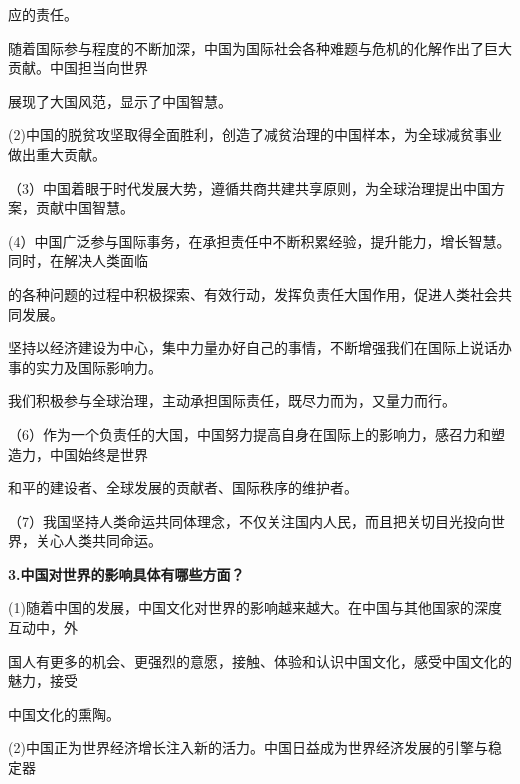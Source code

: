 \documentclass[lang=cn,11pt]{elegantbook}
\begin{document}
应的责任。\par

随着国际参与程度的不断加深，中国为国际社会各种难题与危机的化解作出了巨大贡献。中国担当向世界\par

展现了大国风范，显示了中国智慧。\par

(2)中国的脱贫攻坚取得全面胜利，创造了减贫治理的中国样本，为全球减贫事业做出重大贡献。\par

（3）中国着眼于时代发展大势，遵循共商共建共享原则，为全球治理提出中国方案，贡献中国智慧。\par

(4）中国广泛参与国际事务，在承担责任中不断积累经验，提升能力，增长智慧。同时，在解决人类面临\par

的各种问题的过程中积极探索、有效行动，发挥负责任大国作用，促进人类社会共同发展。\par

坚持以经济建设为中心，集中力量办好自己的事情，不断增强我们在国际上说话办事的实力及国际影响力。\par

我们积极参与全球治理，主动承担国际责任，既尽力而为，又量力而行。\par

（6）作为一个负责任的大国，中国努力提高自身在国际上的影响力，感召力和塑造力，中国始终是世界\par

和平的建设者、全球发展的贡献者、国际秩序的维护者。\par

（7）我国坚持人类命运共同体理念，不仅关注国内人民，而且把关切目光投向世界，关心人类共同命运。\par

\textbf{3.中国对世界的影响具体有哪些方面？}\par

(1)随着中国的发展，中国文化对世界的影响越来越大。在中国与其他国家的深度互动中，外\par

国人有更多的机会、更强烈的意愿，接触、体验和认识中国文化，感受中国文化的魅力，接受\par

中国文化的熏陶。\par

(2)中国正为世界经济增长注入新的活力。中国日益成为世界经济发展的引擎与稳定器\par
\end{document}
